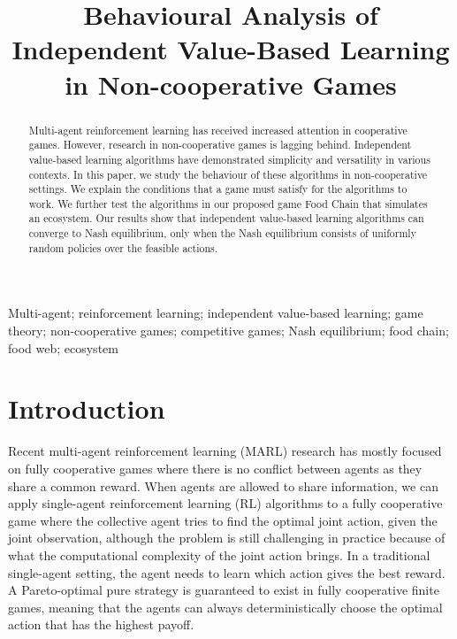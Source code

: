 \documentclass[]{interact}
\theoremstyle{plain}%
\theoremstyle{definition}
\theoremstyle{remark}
\begin{document}

\title{Behavioural Analysis of Independent Value-Based Learning in Non-cooperative Games}

\author{
}

\maketitle

\begin{abstract}
Multi-agent reinforcement learning has received increased attention in cooperative games. However, research in non-cooperative games is lagging behind. Independent value-based learning algorithms have demonstrated simplicity and versatility in various contexts. In this paper, we study the behaviour of these algorithms in non-cooperative settings. We explain the conditions that a game must satisfy for the algorithms to work. We further test the algorithms in our proposed game Food Chain that simulates an ecosystem. Our results show that independent value-based learning algorithms can converge to Nash equilibrium, only when the Nash equilibrium consists of uniformly random policies over the feasible actions.
\end{abstract}

\begin{keywords}
Multi-agent; reinforcement learning; independent value-based learning; game theory; non-cooperative games; competitive games; Nash equilibrium; food chain; food web; ecosystem
\end{keywords}

\section{Introduction}
Recent multi-agent reinforcement learning (MARL) research has mostly focused on fully cooperative games \cite{yu2020benchmarking, papoudakis2020benchmarking, zhu2024survey} where there is no conflict between agents as they share a common reward. When agents are allowed to share information, we can apply single-agent reinforcement learning (RL) algorithms to a fully cooperative game where the collective agent tries to find the optimal joint action, given the joint observation, although the problem is still challenging in practice because of what the computational complexity of the joint action brings. In a traditional single-agent setting, the agent needs to learn which action gives the best reward. A Pareto-optimal pure strategy is guaranteed to exist in fully cooperative finite games, meaning that the agents can always deterministically choose the optimal action that has the highest payoff.
\end{document}
